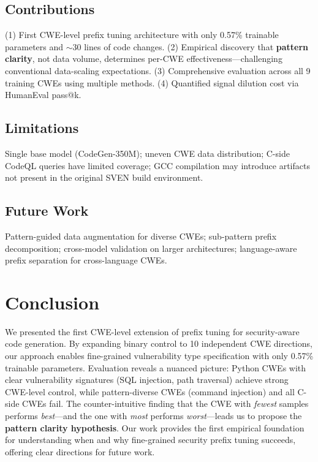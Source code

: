 \documentclass[conference]{IEEEtran}
\begin{document}
\subsection{Contributions}

(1) First CWE-level prefix tuning architecture with only 0.57\% trainable parameters and $\sim$30 lines of code changes. (2) Empirical discovery that \textbf{pattern clarity}, not data volume, determines per-CWE effectiveness—challenging conventional data-scaling expectations. (3) Comprehensive evaluation across all 9 training CWEs using multiple methods. (4) Quantified signal dilution cost via HumanEval pass@k.

\subsection{Limitations}

Single base model (CodeGen-350M); uneven CWE data distribution; C-side CodeQL queries have limited coverage; GCC compilation may introduce artifacts not present in the original SVEN build environment.

\subsection{Future Work}

Pattern-guided data augmentation for diverse CWEs; sub-pattern prefix decomposition; cross-model validation on larger architectures; language-aware prefix separation for cross-language CWEs.

\section{Conclusion}

We presented the first CWE-level extension of prefix tuning for security-aware code generation. By expanding binary control to 10 independent CWE directions, our approach enables fine-grained vulnerability type specification with only 0.57\% trainable parameters. Evaluation reveals a nuanced picture: Python CWEs with clear vulnerability signatures (SQL injection, path traversal) achieve strong CWE-level control, while pattern-diverse CWEs (command injection) and all C-side CWEs fail. The counter-intuitive finding that the CWE with \textit{fewest} samples performs \textit{best}—and the one with \textit{most} performs \textit{worst}—leads us to propose the \textbf{pattern clarity hypothesis}. Our work provides the first empirical foundation for understanding when and why fine-grained security prefix tuning succeeds, offering clear directions for future work.
\end{document}
